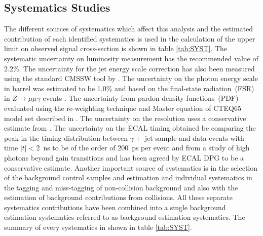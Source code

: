 \subsection{Systematics Studies}
The different sources of systematics which affect this analysis and the estimated contribution of each identified systematics is used in the calculation of the upper limit on observed signal cross-section is shown in table \ref{tab:SYST}.
The systematic uncertainty on luminosity measurement has the recommended value of $2.2$\%. The uncertainty for the jet energy scale correction has also been measured using the standard CMSSW tool by \cite{JES}. The uncertainty on the photon energy scale in barrel was estimated to be 1.0\% and based on the final-state radiation~(FSR) in $Z\rightarrow \mu\mu\gamma$ events \cite{PES}. The uncertainty from pardon density functions~(PDF) evaluated using the re-weighting technique and Master equation of CTEQ65 model set described in \cite{PDF}. The uncertainty on the \MET resolution uses a conservative estimate from \cite{METRES}. The uncertainty on the ECAL timing obtained be comparing the peak in the timing distribution between $\gamma +$ jet sample and data events with time $|t| < 2$~ns to be of the order of 200~ps per event and from a study of high \pt photons beyond gain transitions and has been agreed by ECAL DPG to be a conservative estimate. Another important source of systematics is in the selection of the background control samples and estimation and individual systematics in the tagging and miss-tagging of non-collision background and also with the estimation of background contributions from collisions. All these separate systematics contributions have been combined into a single background estimation systematics referred to as background estimation systematics. The summary of every systematics in shown in table \ref{tab:SYST}. 



